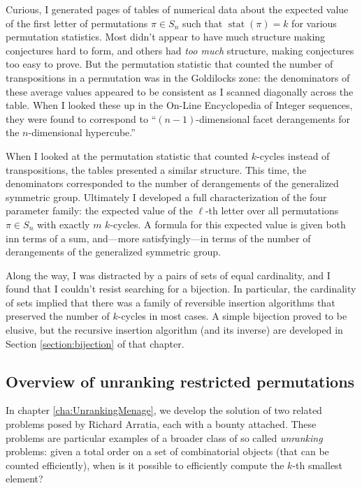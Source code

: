 Curious, I generated pages of tables of numerical data about the expected value
of the first letter of permutations $\pi \in S_n$ such that
$\operatorname{stat}(\pi) = k$ for various permutation statistics.
Most didn't appear to have much structure making conjectures hard to form,
and others had \textit{too much} structure, making conjectures too easy to
prove.
But the permutation statistic that counted the number of transpositions in a
permutation was in the Goldilocks zone: the denominators of these average
values appeared to be consistent as I scanned diagonally across the table.
When I looked these up in the On-Line Encyclopedia of Integer sequences,
they were found to correspond to
``$(n-1)$-dimensional facet derangements for the $n$-dimensional hypercube.''

When I looked at the permutation statistic that counted $k$-cycles instead of
transpositions, the tables presented a similar structure. This time, the
denominators corresponded to the number of derangements of the generalized
symmetric group. Ultimately I developed a full characterization of the four
parameter family: the expected value of the $\ell$-th letter over all
permutations $\pi \in S_n$ with exactly $m$ $k$-cycles.
A formula for this expected value is given both inn terms of a sum,
and---more satisfyingly---in terms of the number of derangements of the
 generalized symmetric group.

Along the way, I was distracted by a pairs of sets of equal cardinality,
and I found that I couldn't resist searching for a bijection.
In particular, the cardinality of sets implied that there was a
family of reversible insertion algorithms that preserved the number of
$k$-cycles in most cases. A simple bijection proved to be elusive, but
the recursive insertion algorithm (and its inverse) are developed in
Section \ref{section:bijection} of that chapter.

\subsection{Overview of unranking restricted permutations}
In chapter \ref{cha:UnrankingMenage}, we develop the solution of two related
problems posed by Richard Arratia, each with a bounty attached.
These problems are particular examples of a broader class of so called
\textit{unranking} problems:
given a total order on a set of combinatorial objects (that can be counted
efficiently), when is it possible to efficiently compute the $k$-th smallest
element?


